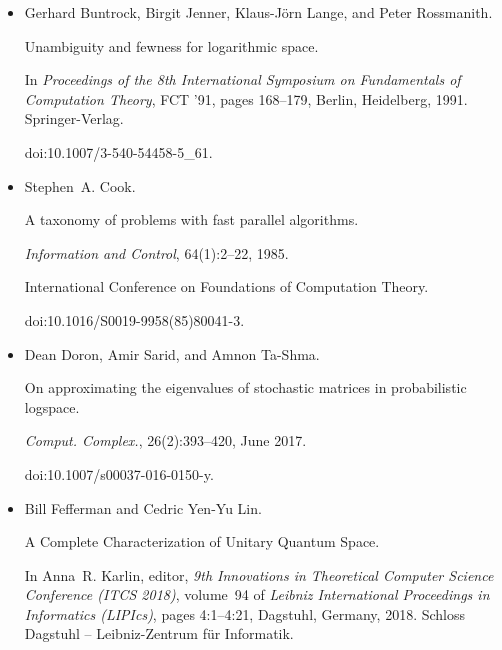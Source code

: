 \begin{itemize}
A sublinear space, polynomial time algorithm for directed s-t
connectivity.


\emph{SIAM Journal on Computing}, 27(5):1273–1282, 1998.


doi:10.1137/S0097539793283151.





\item[] 
[6]

Gerhard Buntrock, Birgit Jenner, Klaus-Jörn Lange, and Peter Rossmanith.


Unambiguity and fewness for logarithmic space.


In \emph{Proceedings of the 8th International Symposium on
Fundamentals of Computation Theory}, FCT ’91, pages 168–179, Berlin,
Heidelberg, 1991. Springer-Verlag.


doi:10.1007/3-540-54458-5\_61.





\item[] 
[7]

Stephen A. Cook.


A taxonomy of problems with fast parallel algorithms.


\emph{Information and Control}, 64(1):2–22, 1985.


International Conference on Foundations of Computation Theory.


doi:10.1016/S0019-9958(85)80041-3.





\item[] 
[8]

Dean Doron, Amir Sarid, and Amnon Ta-Shma.


On approximating the eigenvalues of stochastic matrices in
probabilistic logspace.


\emph{Comput. Complex.}, 26(2):393–420, June 2017.


doi:10.1007/s00037-016-0150-y.





\item[] 
[9]

Bill Fefferman and Cedric Yen-Yu Lin.


A Complete Characterization of Unitary Quantum Space.


In Anna R. Karlin, editor, \emph{9th Innovations in Theoretical
Computer Science Conference (ITCS 2018)}, volume 94 of \emph{Leibniz
International Proceedings in Informatics (LIPIcs)}, pages 4:1–4:21,
Dagstuhl, Germany, 2018. Schloss Dagstuhl – Leibniz-Zentrum für
Informatik.



\end{itemize}
